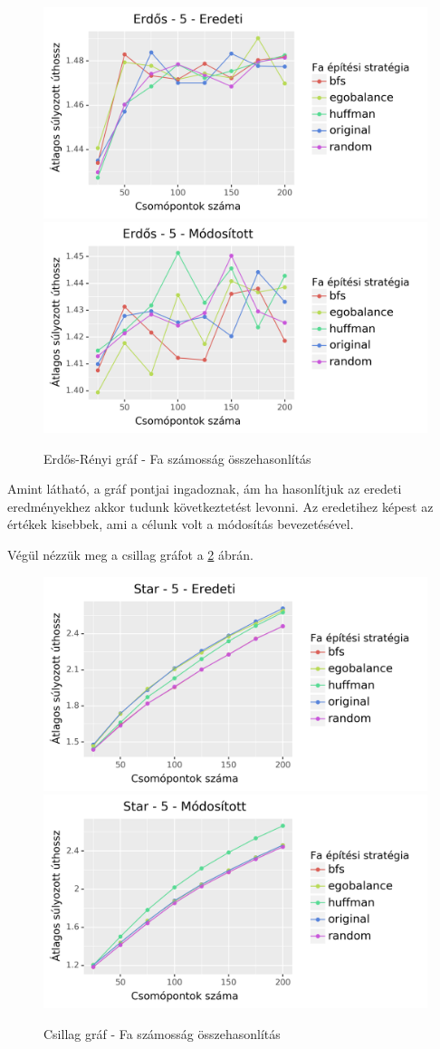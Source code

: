\documentclass[12pt]{report}
\begin{document}
\begin{figure}[H]
	\begin{center}
		\includegraphics[width=0.49\linewidth]{pictures/erdos_len_e.png}
		\includegraphics[width=0.49\linewidth]{pictures/erdos_len_m.png}
		\caption{Erdős-Rényi gráf - Fa számosság összehasonlítás}
		\label{erdos-tree-difference-len}
	\end{center}
\end{figure}

Amint látható, a gráf pontjai ingadoznak, ám ha hasonlítjuk az eredeti eredményekhez akkor tudunk következtetést levonni.
Az eredetihez képest az értékek kisebbek, ami a célunk volt a módosítás bevezetésével.

Végül nézzük meg a csillag gráfot a \ref{star-tree-difference-len} ábrán. 

\begin{figure}[H]
	\begin{center}
		\includegraphics[width=0.49\linewidth]{pictures/star_len_e.png}
		\includegraphics[width=0.49\linewidth]{pictures/star_len_m.png}
		\caption{Csillag gráf - Fa számosság összehasonlítás}
		\label{star-tree-difference-len}
	\end{center}
\end{figure}
\end{document}

